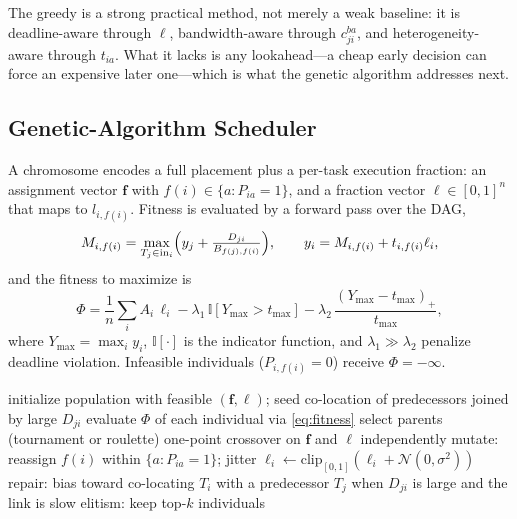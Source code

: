 \documentclass[conference]{IEEEtran}
\begin{document}
The greedy is a strong practical method, not merely a weak baseline: it is deadline-aware through $\ell$, bandwidth-aware through $c_{ji}^{ba}$, and heterogeneity-aware through $t_{ia}$. What it lacks is any lookahead---a cheap early decision can force an expensive later one---which is what the genetic algorithm addresses next.

\subsection{Genetic-Algorithm Scheduler}
\label{sec:ga}

A chromosome encodes a full placement plus a per-task execution fraction: an assignment vector $\mathbf{f}$ with $f(i)\in\{a:P_{ia}=1\}$, and a fraction vector $\boldsymbol{\ell}\in[0,1]^n$ that maps to $l_{i,f(i)}$. Fitness is evaluated by a forward pass over the DAG,
\begin{equation}
M_{i,f(i)}=\max_{T_j\in \mathrm{in}_i}\Bigl(y_j+\tfrac{D_{ji}}{B_{f(j),f(i)}}\Bigr),\qquad
y_i=M_{i,f(i)}+t_{i,f(i)}\ell_i,
\end{equation}
and the fitness to maximize is
\begin{equation}
\Phi=\frac{1}{n}\sum_i A_i\,\ell_i
-\lambda_1\,\mathbb{I}[Y_{\max}>t_{\max}]
-\lambda_2\,\frac{(Y_{\max}-t_{\max})_+}{t_{\max}},
\label{eq:fitness}
\end{equation}
where $Y_{\max}=\max_i y_i$, $\mathbb{I}[\cdot]$ is the indicator function, and $\lambda_1\gg\lambda_2$ penalize deadline violation. Infeasible individuals ($P_{i,f(i)}=0$) receive $\Phi=-\infty$.

\begin{algorithm}[t]
\caption{Genetic Algorithm for Bandwidth/Data-Aware Fog Scheduling}
\label{alg:ga}
\begin{algorithmic}[1]
\STATE initialize population with feasible $(\mathbf{f},\boldsymbol{\ell})$; seed co-location of predecessors joined by large $D_{ji}$
\REPEAT
    \STATE evaluate $\Phi$ of each individual via \eqref{eq:fitness}
    \STATE select parents (tournament or roulette)
    \STATE one-point crossover on $\mathbf{f}$ and $\boldsymbol{\ell}$ independently
    \STATE mutate: reassign $f(i)$ within $\{a:P_{ia}=1\}$; jitter $\ell_i\leftarrow\mathrm{clip}_{[0,1]}(\ell_i+\mathcal{N}(0,\sigma^2))$
    \STATE repair: bias toward co-locating $T_i$ with a predecessor $T_j$ when $D_{ji}$ is large and the link is slow
    \STATE elitism: keep top-$k$ individuals
\end{algorithmic}
\end{algorithm}
\end{document}
